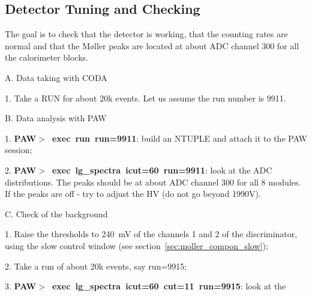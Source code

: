 {\subsection{Detector Tuning and Checking }
\label{sec:dettune}
\vspace{-\parskip}

The goal is to check that the detector is working, that the counting rates
are normal and that the M{\o}ller peaks are located at about ADC channel 300
for all the calorimeter blocks.

\vspace{-\parskip}
\begin{list}{}{\setlength{\itemsep}{0.5cm}}
  \item[A.] Data taking with CODA
  \vspace{-\parskip}
      \begin{list}{}{\setlength{\itemsep}{0.cm}}
             \item[1.] Take a RUN for about 20k events. Let us assume the run 
                       number is 9911.
        \end{list}
  \item[B.] Data analysis with PAW
\vspace{-\parskip}
        \begin{list}{--}{\setlength{\itemsep}{0.cm}}
             \item[1.]  {\bf PAW$>$~exec~run~run=9911}: build an NTUPLE and 
                       attach it to the PAW session;
             \item[2.]  {\bf PAW$>$~exec~lg\_spectra~icut=60~run=9911}: look at the 
                       ADC distributions. The peaks should be at about ADC channel 300
                       for all 8 modules. If the peaks are off - try to adjust
                       the HV (do not go beyond 1990V).
        \end{list}
  \item[C.] Check of the background
\vspace{-\parskip}
        \begin{list}{}{\setlength{\itemsep}{0.cm}}
             \item[1.] Raise the thresholds to 240~mV of the channels 1 and 2
                       of the discriminator, using the slow control window 
                       (see section~\ref{sec:moller_compon_slow});
             \item[2.] Take a run of about 20k events, say run=9915;
             \item[3.]  {\bf PAW$>$~exec~lg\_spectra~icut=60~cut=11~run=9915}: look at the 

\end{list}
\end{list}}
